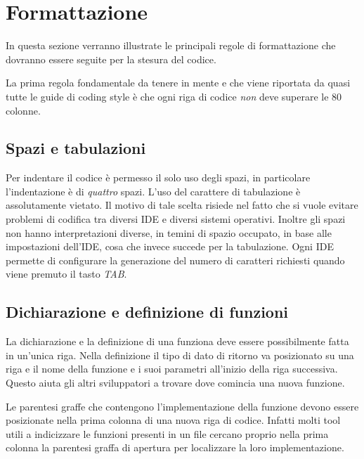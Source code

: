 %
%

\section{Formattazione}\label{sec:formatting}

In questa sezione verranno illustrate le principali regole di formattazione che dovranno essere seguite per la stesura del codice.

La prima regola fondamentale da tenere in mente e che viene riportata da quasi tutte le guide di coding style\cite{codestyle:google,codestyle:geotechnical,codestyle:quantum} è che ogni riga di codice \emph{non} deve superare le 80 colonne.

\subsection{Spazi e tabulazioni}

Per indentare il codice è permesso il solo uso degli spazi, in particolare l'indentazione è di \emph{quattro} spazi.
L'uso del carattere di tabulazione è assolutamente vietato.
Il motivo di tale scelta risiede nel fatto che si vuole evitare problemi di codifica tra diversi IDE e diversi sistemi operativi.
Inoltre gli spazi non hanno interpretazioni diverse, in temini di spazio occupato, in base alle impostazioni dell'IDE, cosa che invece succede per la tabulazione.
Ogni IDE permette di configurare la generazione del numero di caratteri richiesti quando viene premuto il tasto \emph{TAB}.

\subsection{Dichiarazione e definizione di funzioni}\label{ssec:formattingfunction}

La dichiarazione e la definizione di una funziona deve essere possibilmente fatta in un'unica riga.
Nella definizione il tipo di dato di ritorno va posizionato su una riga e il nome della funzione e i suoi parametri all'inizio della riga successiva.
Questo aiuta gli altri sviluppatori a trovare dove comincia una nuova funzione.

Le parentesi graffe che contengono l'implementazione della funzione devono essere posizionate nella prima colonna di una nuova riga di codice.
Infatti molti tool utili a indicizzare le funzioni presenti in un file cercano proprio nella prima colonna la parentesi graffa di apertura per localizzare la loro implementazione.

